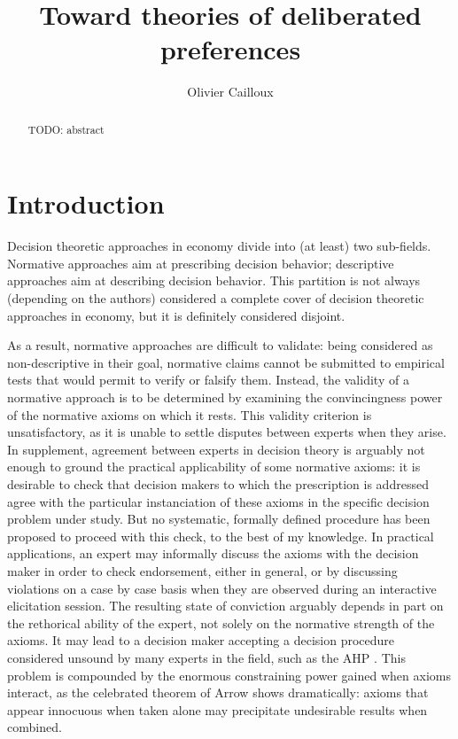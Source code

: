 \documentclass[version=last, pagesize, twoside=off, bibliography=totoc, DIV=calc, fontsize=12pt, a4paper, french, english]{scrartcl}
\begin{document}
\title{Toward theories of deliberated preferences}
\author{Olivier Cailloux}
\makeatletter
\makeatother
\maketitle

\begin{abstract}
	TODO: abstract
\end{abstract}

\section{Introduction} 
Decision theoretic approaches in economy divide into (at least) two sub-fields. Normative approaches aim at prescribing decision behavior; descriptive approaches aim at describing decision behavior. This partition is not always (depending on the authors) considered a complete cover of decision theoretic approaches in economy, but it is definitely considered disjoint.

As a result, normative approaches are difficult to validate: being considered as non-descriptive in their goal, normative claims cannot be submitted to empirical tests that would permit to verify or falsify them.
Instead, the validity of a normative approach is to be determined by examining the convincingness power of the normative axioms on which it rests.
This validity criterion is unsatisfactory, as it is unable to settle disputes between experts when they arise. In supplement, agreement between experts in decision theory is arguably not enough to ground the practical applicability of some normative axioms: it is desirable to check that decision makers to which the prescription is addressed agree with the particular instanciation of these axioms in the specific decision problem under study. But no systematic, formally defined procedure has been proposed to proceed with this check, to the best of my knowledge. 
In practical applications, an expert may informally discuss the axioms with the decision maker in order to check endorsement, either in general, or by discussing violations on a case by case basis when they are observed during an interactive elicitation session. 
The resulting state of conviction arguably depends in part on the rethorical ability of the expert, not solely on the normative strength of the axioms. It may lead to a decision maker accepting a decision procedure considered unsound by many experts in the field, such as the \ac{AHP} \citep{smith_anniversary_2004}. 
This problem is compounded by the enormous constraining power gained when axioms interact, as the celebrated theorem of Arrow shows dramatically: axioms that appear innocuous when taken alone may precipitate undesirable results when combined.
\end{document}
